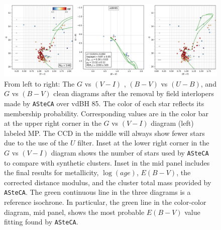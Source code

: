 \documentclass[draft]{aa}
\begin{document}
\begin{figure}[ht]
    \centering
    \includegraphics[width=\hsize]{../figs/cmds_vdBH85.png}
\caption{From left to right: The $G$ vs $(V-I)$ , $(B-V)$ vs $(U-B)$,
and $G$ vs $(B-V)$ clean diagrams after the removal by field interlopers
made by \texttt{ASteCA} over vdBH 85. The color of each star reflects
its membership probability. Corresponding values are in the color bar at
the upper right corner in the $G$ vs $(V-I)$ diagram (left) labeled
MP. The CCD in the middle will always show fewer stars due to the
use of the $U$ filter.
Inset at the lower right corner in the $G$ vs $(V-I)$ diagram shows
the number of stars used by \texttt{ASteCA} to compare with synthetic clusters.
Inset in the mid panel includes the final
results for metallicity, $\log(age)$, $E(B-V)$, the corrected distance
modulus, and the cluster total mass provided by \texttt{ASteCA}. The green
continuous line in the three diagrams is a reference isochrone. In
particular, the green line in the color-color diagram, mid panel, shows the
most probable $E(B-V)$ value fitting found by \texttt{ASteCA}.
}
    \label{fig:fundpars_vdBH85}
\end{figure}
\end{document}
